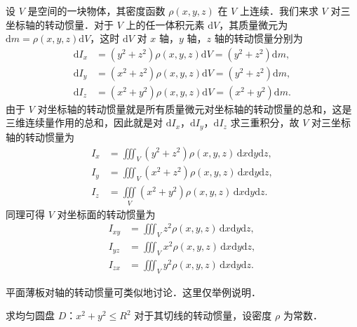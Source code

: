 设 $V$ 是空间的一块物体，其密度函数 $\rho(x,y,z)$ 在 $V$ 上连续．我们来求 $V$ 对三坐标轴的转动惯量．对于 $V$ 上的任一体积元素 $\mathrm{d}V$，其质量微元为 $\mathrm{d}m=\rho(x,y,z)\mathrm{d}V$，这时 $\mathrm{d}V$ 对 $x$ 轴，$y$ 轴，$z$ 轴的转动惯量分别为
\[
\begin{aligned}
\mathrm{d}I_{x}&=\left(y^{2}+z^{2}\right)\rho(x,y,z)\mathrm{d}V=\left(y^{2}+z^{2}\right)\mathrm{d}m,\\
\mathrm{d}I_{y}&=\left(x^{2}+z^{2}\right)\rho(x,y,z)\mathrm{d}V=\left(y^{2}+z^{2}\right)\mathrm{d}m,\\
\mathrm{d}I_{z}&=\left(x^{2}+y^{2}\right)\rho(x,y,z)\mathrm{d}V=\left(x^{2}+y^{2}\right)\mathrm{d}m.
\end{aligned}
\]
由于 $V$ 对坐标轴的转动惯量就是所有质量微元对坐标轴的转动惯量的总和，这是三维连续量作用的总和，因此就是对 $\mathrm{d}I_{x}$，$\mathrm{d}I_{y}$，$\mathrm{d}I_{z}$ 求三重积分，故 $V$ 对三坐标轴的转动惯量为
\[
\begin{aligned}
I_{x}&=\iiint_{V}\left(y^{2}+z^{2}\right)\rho(x,y,z)\,\mathrm{d}x\mathrm{d}y\mathrm{d}z,\\
I_{y}&=\iiint_{V}\left(x^{2}+z^{2}\right)\rho(x,y,z)\,\mathrm{d}x\mathrm{d}y\mathrm{d}z,\\
I_{z}&=\iiint\limits_{V}\left(x^{2}+y^{2}\right)\rho(x,y,z)\,\mathrm{d}x\mathrm{d}y\mathrm{d}z.
\end{aligned}
\]
同理可得 $V$ 对坐标面的转动惯量为
\[
\begin{aligned}
I_{xy}&=\iiint_{V}z^{2}\rho(x,y,z)\,\mathrm{d}x\mathrm{d}y\mathrm{d}z,\\
I_{yz}&=\iiint_{V}x^{2}\rho(x,y,z)\,\mathrm{d}x\mathrm{d}y\mathrm{d}z,\\
I_{zx}&=\iiint_{V}y^{2}\rho(x,y,z)\,\mathrm{d}x\mathrm{d}y\mathrm{d}z.
\end{aligned}
\]

平面薄板对轴的转动惯量可类似地讨论．这里仅举例说明．

\begin{example}\label{ex:20-5-2}
求均匀圆盘 $D$：$x^{2}+y^{2}\leqslant R^{2}$ 对于其切线的转动惯量，设密度 $\rho$ 为常数．
\end{example}


